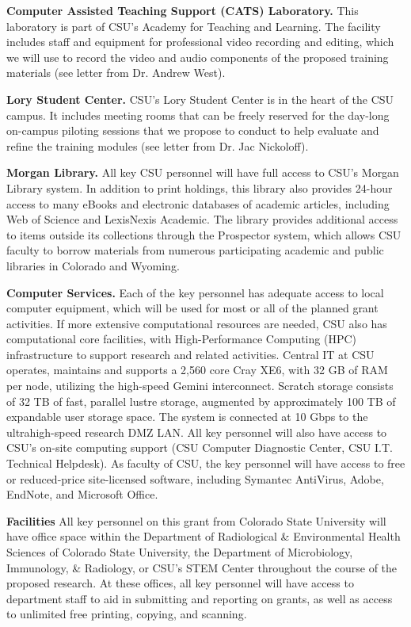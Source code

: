 \documentclass[pdftex,english,11pt,parskip=half]{scrartcl}
\begin{document}
\textbf{Computer Assisted Teaching Support (CATS) Laboratory.} This laboratory is part of CSU's Academy for Teaching and Learning. The facility includes staff and equipment for professional video recording and editing, which we will use to record the video and audio components of the proposed training materials (see letter from Dr. Andrew West). 

\textbf{Lory Student Center.} CSU's Lory Student Center is in the heart of the CSU campus. It includes meeting rooms that can be freely reserved for the day-long on-campus piloting sessions that we propose to conduct to help evaluate and refine the training modules (see letter from Dr. Jac Nickoloff).

\textbf{Morgan Library.} All key CSU personnel will have full access to CSU’s Morgan Library system. In addition to print holdings, this library also provides 24-hour access to many eBooks and electronic databases of academic articles, including Web of Science and LexisNexis Academic. The library provides additional access to items outside its collections through the Prospector system, which allows CSU faculty to borrow materials from numerous participating academic and public libraries in Colorado and Wyoming. 

\textbf{Computer Services.} Each of the key personnel has adequate access to local computer equipment, which will be used for most or all of the planned grant activities. If more extensive computational resources are needed, CSU also has computational core facilities, with High-Performance Computing (HPC) infrastructure to support research and related activities. Central IT at CSU operates, maintains and supports a 2,560 core Cray XE6, with 32 GB of RAM per node, utilizing the high-speed Gemini interconnect. Scratch storage consists of 32 TB of fast, parallel lustre storage, augmented by approximately 100 TB of expandable user storage space. The system is connected at 10 Gbps to the ultrahigh-speed research DMZ LAN. All key personnel will also have access to CSU’s on-site computing support (CSU Computer Diagnostic Center, CSU I.T. Technical Helpdesk). As faculty of CSU, the key personnel will have access to free or reduced-price site-licensed software, including Symantec AntiVirus, Adobe, EndNote, and Microsoft Office.

\textbf{Facilities} All key personnel on this grant from Colorado State University will have office space within the Department of Radiological \& Environmental Health Sciences of Colorado State University, the Department of Microbiology, Immunology, \& Radiology, or CSU's STEM Center throughout the course of the proposed research. At these offices, all key personnel will have access to department staff to aid in submitting and reporting on grants, as well as access to unlimited free printing, copying, and scanning.
\end{document}
